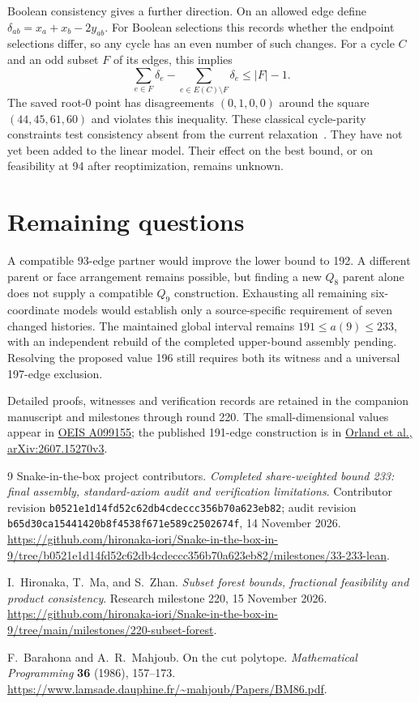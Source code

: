 \documentclass[11pt,a4paper]{article}
\begin{document}
Boolean consistency gives a further direction. On an allowed edge define
$\delta_{ab}=x_a+x_b-2y_{ab}$. For Boolean selections this records whether
the endpoint selections differ, so any cycle has an even number of such changes.
For a cycle $C$ and an odd subset $F$ of its edges, this implies
\[
\sum_{e\in F}\delta_e-\sum_{e\in E(C)\setminus F}\delta_e\le|F|-1.
\]
The saved root-0 point has disagreements $(0,1,0,0)$ around the square
$(44,45,61,60)$ and violates this inequality. These classical cycle-parity
constraints test consistency absent from the current relaxation~\cite{barahona1986}.
They have not yet been added to the linear model. Their effect on the best
bound, or on feasibility at 94 after reoptimization, remains unknown.

\section{Remaining questions}
A compatible 93-edge partner would improve the lower bound to 192.
A different parent or face arrangement remains possible, but finding a
new $Q_8$ parent alone does not supply a compatible $Q_9$ construction.
Exhausting all remaining six-coordinate models would establish only a
source-specific requirement of seven changed histories.
The maintained global interval remains $191\le a(9)\le233$, with an
independent rebuild of the completed upper-bound assembly pending.
Resolving the proposed value 196 still requires both its witness and
a universal 197-edge exclusion.

\smallskip
{\small Detailed proofs, witnesses and verification records are retained
in the companion manuscript and milestones through round 220.
The small-dimensional values appear in
\href{https://oeis.org/A099155}{OEIS A099155}; the published 191-edge
construction is in
\href{https://arxiv.org/html/2607.15270v3}{Orland et al., arXiv:2607.15270v3}.}

\begin{thebibliography}{9}
Snake-in-the-box project contributors. \emph{Completed share-weighted bound
233: final assembly, standard-axiom audit and verification limitations}.
Contributor revision \texttt{b0521e1d14fd52c62db4cdeccc356b70a623eb82};
audit revision \texttt{b65d30ca15441420b8f4538f671e589c2502674f},
14 November 2026.
\url{https://github.com/hironaka-iori/Snake-in-the-box-in-9/tree/b0521e1d14fd52c62db4cdeccc356b70a623eb82/milestones/33-233-lean}.


I.~Hironaka, T.~Ma, and S.~Zhan. \emph{Subset forest bounds,
fractional feasibility and product consistency}. Research milestone 220,
15 November 2026.
\url{https://github.com/hironaka-iori/Snake-in-the-box-in-9/tree/main/milestones/220-subset-forest}.

F.~Barahona and A.~R.~Mahjoub. On the cut polytope.
\emph{Mathematical Programming} \textbf{36} (1986), 157--173.
\url{https://www.lamsade.dauphine.fr/~mahjoub/Papers/BM86.pdf}.

\end{thebibliography}
\end{document}
